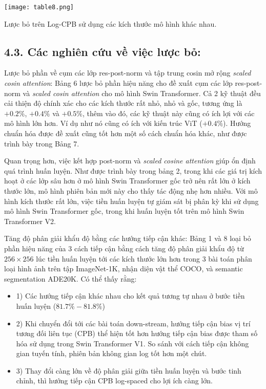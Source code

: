 \documentclass[times, twocolumn]{zHenriquesLab-StyleBioRxiv}
\begin{document}
\begin{table}[!ht]
    \centering
    \texttt{[image: table8.png]}
    \caption{Lược bỏ trên Log-CPB sử dụng các kích thước mô hình khác nhau.}
\end{table}

\subsection*{4.3. Các nghiên cứu về việc lược bỏ:}
Lược bỏ phần về cụm các lớp res-post-norm và tập trung cosin mở rộng \textit{scaled cosin attention}: Bảng 6 lược bỏ phần hiệu năng cho đề xuất cụm các lớp res-post-norm và \textit{scaled cosin attention} cho mô hình Swin Transformer. Cả 2 kỹ thuật đều cải thiện độ chính xác cho các kích thước rất nhỏ, nhỏ và gốc, tương ứng là $+0.2\%$, $+0.4\%$ và $+0.5\%$, thêm vào đó, các kỹ thuật này cũng có ích lợi với các mô hình lớn hơn. Ví dụ như nó cũng có ích với kiến trúc ViT ($+0.4\%$). Hướng chuẩn hóa được đề xuất cũng tốt hơn một số cách chuẩn hóa khác, như được trình bày trong Bảng 7.

Quan trọng hơn, việc kết hợp post-norm và \textit{scaled cosine attention} giúp ổn định quá trình huấn luyện. Như được trình bày trong bảng 2, trong khi các giá trị kích hoạt ở các lớp sâu hơn ở mô hình Swin Transformer gốc trở nên rất lớn ở kích thước lớn, mô hình phiên bản mới này cho thấy tác động nhẹ hơn nhiều. Với mô hình kích thước rất lớn, việc tiền huấn luyện tự giám sát bị phân kỳ khi sử dụng mô hình Swin Transformer gốc, trong khi huấn luyện tốt trên mô hình Swin Transformer V2.

Tăng độ phân giải khẩu độ bằng các hướng tiếp cận khác: Bảng 1 và 8 loại bỏ phần hiệu năng của $3$ cách tiếp cận bằng cách tăng độ phân giải khẩu độ từ $256\times256$ lúc tiền huấn luyện tới các kích thước lớn hơn trong $3$ bài toán phân loại hình ảnh trên tập ImageNet-1K, nhận diện vật thể COCO, và semantic segmentation ADE20K. Có thể thấy rằng:
\begin{itemize}
    \item 1) Các hướng tiếp cận khác nhau cho kết quả tương tự nhau ở bước tiền huấn luyện ($81.7\%-81.8\%$)
    \item 2) Khi chuyển đổi tới các bài toán down-stream, hướng tiếp cận bias vị trí tương đối liên tục (CPB) thể hiện tốt hơn hướng tiếp cận bias được tham số hóa sử dụng trong Swin Transformer V1. So sánh với cách tiếp cận không gian tuyến tính, phiên bản không gian log tốt hơn một chút.
    \item 3) Thay đổi càng lớn về độ phân giải giữa tiền huấn luyện và bước tinh chỉnh, thì hướng tiếp cận CPB log-spaced cho lợi ích càng lớn.
\end{itemize}
\end{document}
